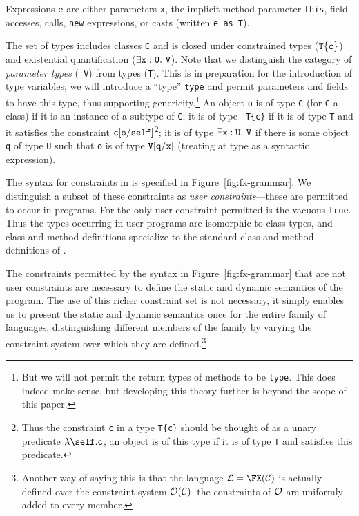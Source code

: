 Expressions {\tt e} are either parameters {\tt x}, the implicit
method parameter {\tt this}, field accesses, calls, {\tt new}
expressions, or casts (written {\tt e as T}).

The set of types includes classes {\tt C} and is closed under
constrained types (${\tt T\{c\}}$) and existential
quantification ($\exists {\tt x}:{\tt U}.~{\tt V}$).
%
Note that we distinguish the category of {\em parameter types} ({\tt
V}) from types ({\tt T}). This is in preparation for the introduction
of type variables; we will introduce a ``type'' {\tt type} and permit
parameters and fields to have this type, thus supporting
genericity.\footnote{But we will not permit the return types of
methods to be {\tt type}. This does indeed make sense, but developing
this theory further is beyond the scope of this paper.}
%
An object {\tt o} is of type {\tt C} (for {\tt C} a class)
if it is an instance of a subtype of {\tt C}; it is of type {\tt
T\{c\}} if it is of type {\tt T} and it satisfies the constraint $\tt
c[o/self]$\footnote{Thus the constraint {\tt c} in a type {\tt T\{c\}}
should be thought of as a unary predicate $\lambda\self.{\tt c}$, an
object is of this type if it is of type {\tt T} and satisfies this
predicate.}; it is of type
                $\exists {\tt x}:{\tt U}.~{\tt V}$
if there is some object {\tt q}
of type {\tt U} such that {\tt o} is of type
${\tt V}[{\tt q}/{\tt x}]$ (treating at
type as a syntactic expression).

The syntax for constraints in \FXZ{} is specified in
Figure~\ref{fig:fx-grammar}. We distinguish a subset of these constraints as
{\em user constraints}---these are permitted to occur in
programs. For \FXZ{} the only user constraint permitted is the vacuous
{\tt true}. Thus the types occurring in user programs are isomorphic
to class types, and class and method definitions specialize to the
standard class and method definitions of \FJ{}. 

The constraints permitted by the syntax in
Figure~\ref{fig:fx-grammar} that
are not user constraints are necessary to define the static and
dynamic semantics of the program.
The use of this richer constraint set is
not necessary, it simply enables us to present the static and dynamic
semantics once for the entire family of \FX{} languages,
distinguishing different members of the family by varying the
constraint system over which they are defined.\footnote{Another way of
saying this is that the language ${\cal L}=\FX({\cal C})$ is actually
defined over the constraint system ${\cal O}({\cal C})$--the constraints
of $\cal O$ are uniformly added to every \FX{} member.}

